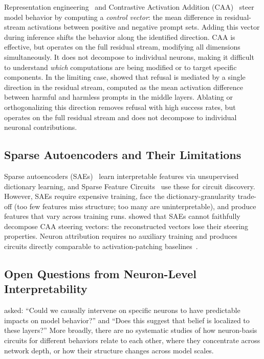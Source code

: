 \documentclass[11pt]{article}
\begin{document}
Representation engineering~\citep{zou2023representation} and Contrastive Activation Addition (CAA)~\citep{rimsky2024steering} steer model behavior by computing a \emph{control vector}: the mean difference in residual-stream activations between positive and negative prompt sets.
Adding this vector during inference shifts the behavior along the identified direction.
CAA is effective, but operates on the full residual stream, modifying all dimensions simultaneously.
It does not decompose to individual neurons, making it difficult to understand \emph{which} computations are being modified or to target specific components.
In the limiting case, \citet{arditi2024refusal} showed that refusal is mediated by a single direction in the residual stream, computed as the mean activation difference between harmful and harmless prompts in the middle layers.
Ablating or orthogonalizing this direction removes refusal with high success rates, but operates on the full residual stream and does not decompose to individual neuronal contributions.

\subsection{Sparse Autoencoders and Their Limitations}
\label{sec:bg_sae}

Sparse autoencoders (SAEs)~\citep{cunningham2023sae, bricken2023monosemanticity, templeton2024scaling} learn interpretable features via unsupervised dictionary learning, and Sparse Feature Circuits~\citep{marks2024sparse} use these for circuit discovery.
However, SAEs require expensive training, face the dictionary-granularity trade-off (too few features miss structure; too many are uninterpretable), and produce features that vary across training runs.
\citet{mayne2024sae_steering} showed that SAEs cannot faithfully decompose CAA steering vectors: the reconstructed vectors lose their steering properties.
Neuron attribution requires no auxiliary training and produces circuits directly comparable to activation-patching baselines~\citep{jafari2025relp}.

\subsection{Open Questions from Neuron-Level Interpretability}
\label{sec:bg_open}

\citet{chalnick2025goodfire} asked: ``Could we causally intervene on specific neurons to have predictable impacts on model behavior?'' and ``Does this suggest that belief is localized to these layers?''
More broadly, there are no systematic studies of how neuron-basis circuits for different behaviors relate to each other, where they concentrate across network depth, or how their structure changes across model scales.
\end{document}
